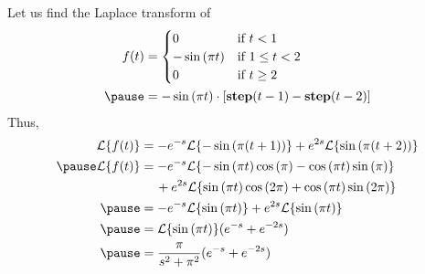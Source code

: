 \documentclass{beamer}
\DeclareMathOperator{\step}{\textbf{step}}
\begin{document}
\begin{frame}
\begin{example}
Let us find the Laplace transform of
\begin{equation*}
\begin{aligned}
f(t)&=
\begin{cases}
0 & \text{if}~t<1 \\
-\sin[\pi t] & \text{if}~1\leq t< 2 \\
0 & \text{if}~t\geq 2
\end{cases}\\\pause
&=-\sin[\pi t]\cdot\left[\step(t-1)-\step(t-2)\right]
\end{aligned}
\end{equation*}\pause
Thus,
\begin{equation*}
\begin{aligned}
\laplace\{f(t)\}&=-e^{-s}\laplace\{-\sin[\pi (t+1)]\}+e^{2s}\laplace\{\sin[\pi (t+2)]\}\\\pause
\laplace\{f(t)\}&=-e^{-s}\laplace\{-\sin[\pi t]\cos[\pi]-\cos[\pi t]\sin[\pi]\}\\
&\hspace{4.2mm}+e^{2s}\laplace\{\sin[\pi t]\cos[2\pi]+\cos[\pi t]\sin[2\pi]\}\\\pause
&=-e^{-s}\laplace\{\sin[\pi t]\}+e^{2s}\laplace\{\sin[\pi t]\}\\\pause
&=\laplace\{\sin[\pi t]\}(e^{-s}+e^{-2s})\\\pause
&=\dfrac{\pi}{s^2+\pi^2}(e^{-s}+e^{-2s})
\end{aligned}
\end{equation*}
\end{example}
\end{frame}
\end{document}
